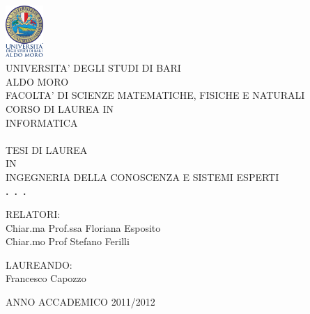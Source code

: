 
\begin{center}
\includegraphics[height=2cm]{Immagini/logo.png}\\
\LARGE{UNIVERSITA' DEGLI STUDI DI BARI}\\
\LARGE{ALDO MORO}\\
\vspace{0.5cm}
\small{FACOLTA' DI SCIENZE MATEMATICHE, FISICHE E NATURALI}\\
CORSO DI LAUREA IN\\
INFORMATICA\\
\hrulefill \\ %
\vspace{0.2cm}
TESI DI LAUREA\\
\vspace{0.2cm}
IN\\
\vspace{0.2cm}
\normalsize{INGEGNERIA DELLA CONOSCENZA E SISTEMI ESPERTI}\\
\vspace{2cm}%
\large{\textbf{.\ .\ .\ }}\\
\thispagestyle{empty}%
\end{center}
\vspace{3cm}
RELATORI:\\
Chiar.ma Prof.ssa Floriana Esposito\\
Chiar.mo Prof Stefano Ferilli

\begin{flushright}
LAUREANDO:\\
Francesco Capozzo\\
\end{flushright}
\hrulefill
\begin{center}
\small{ANNO ACCADEMICO 2011/2012}
\end{center}